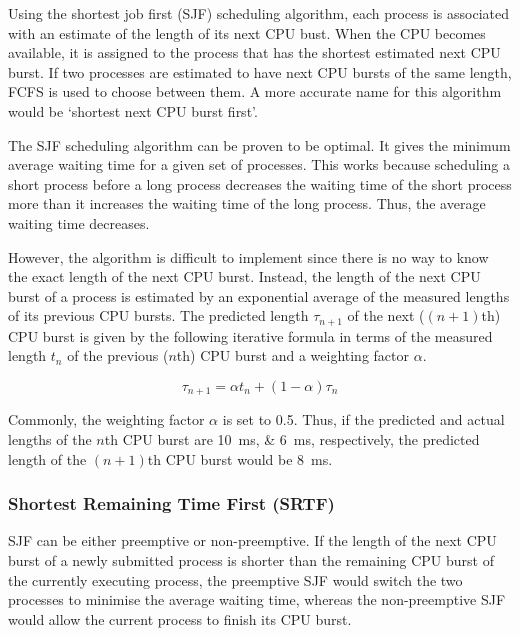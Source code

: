 Using the shortest job first (SJF) scheduling algorithm, each process is associated with an estimate of the length of its next CPU bust.
When the CPU becomes available, it is assigned to the process that has the shortest estimated next CPU burst.
If two processes are estimated to have next CPU bursts of the same length, FCFS is used to choose between them.
A more accurate name for this algorithm would be `shortest next CPU burst first'.

The SJF scheduling algorithm can be proven to be optimal.
It gives the minimum average waiting time for a given set of processes.
This works because scheduling a short process before a long process decreases the waiting time of the short process more than it increases the waiting time of the long process.
Thus, the average waiting time decreases.

However, the algorithm is difficult to implement since there is no way to know the exact length of the next CPU burst.
Instead, the length of the next CPU burst of a process is estimated by an exponential average of the measured lengths of its previous CPU bursts.
The predicted length \( \tau_{n + 1} \) of the next (\( \left( n + 1 \right) \)th) CPU burst is given by the following iterative formula in terms of the measured length \( t_n \) of the previous (\( n \)th) CPU burst and a weighting factor \( \alpha \).

\begin{equation*}
  \tau_{n + 1} = \alpha t_n + \left( 1 - \alpha \right) \tau_n
\end{equation*}

Commonly, the weighting factor \( \alpha \) is set to \num{0.5}.
Thus, if the predicted and actual lengths of the \( n \)th CPU burst are \SIlist{10;6}{\milli\second}, respectively, the predicted length of the \( \left( n + 1 \right) \)th CPU burst would be \SI{8}{\milli\second}.

\subsubsection{Shortest Remaining Time First (SRTF)}

SJF can be either preemptive or non-preemptive.
If the length of the next CPU burst of a newly submitted process is shorter than the remaining CPU burst of the currently executing process, the preemptive SJF would switch the two processes to minimise the average waiting time, whereas the non-preemptive SJF would allow the current process to finish its CPU burst.

